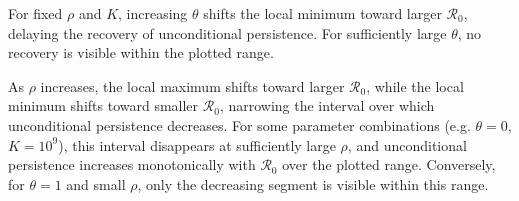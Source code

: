\documentclass[11pt]{article}
\newcommand{\Rzero}{\mathcal R_0}
\newcommand{\rhoeps}{\rho}
\newcommand{\Cth}{C_\theta}
\newcommand{\dAf}{\Delta A_f}
\newcommand{\dd}{\,\mathrm d}
\newcommand{\BI}{\mathrm{BI}}
\begin{document}
For fixed \(\rhoeps\) and \(K\), increasing \(\theta\) shifts the local minimum toward larger \(\Rzero\), delaying the recovery of unconditional persistence. For sufficiently large \(\theta\), no recovery is visible within the plotted range.

As \(\rhoeps\) increases, the local maximum shifts toward larger \(\Rzero\), while the local minimum shifts toward smaller \(\Rzero\), narrowing the interval over which unconditional persistence decreases. For some parameter combinations (e.g. $\theta=0$, $K=10^9$), this interval disappears at sufficiently large \(\rhoeps\), and unconditional persistence increases monotonically with \(\Rzero\) over the plotted range. Conversely, for \(\theta=1\) and small \(\rhoeps\), only the decreasing segment is visible within this range.

%
%
\end{document}
